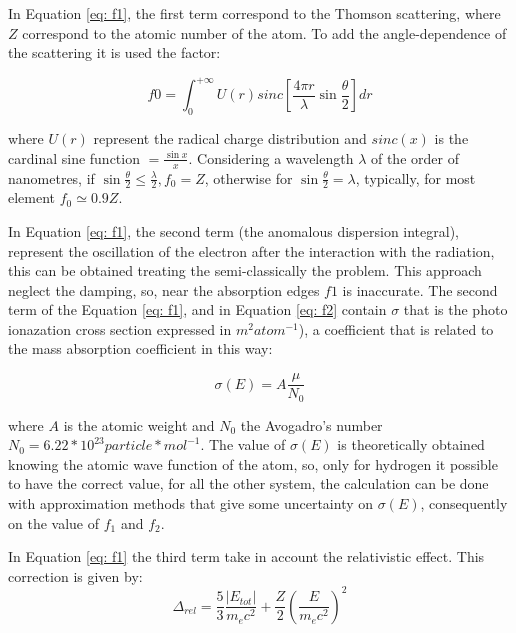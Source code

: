 \begin{flushleft}
In Equation \ref{eq: f1}, the first term correspond to the Thomson scattering, where $Z $ correspond to the atomic number of the atom. To add the angle-dependence of the scattering it is used the factor:
\end{flushleft}

\begin{equation}
f0 = \int_{0}^{+ \infty} U(r) sinc \left[ \frac{4 \pi r}{\lambda} \sin \frac{\theta}{2} \right] dr
\label{f0}
\end{equation}

\begin{flushleft}
where $U(r) $ represent the radical charge distribution and $sinc(x)$ is the cardinal sine function $ = \frac{\sin x}{x} $. Considering a wavelength $\lambda $ of the order of nanometres, if $\sin \frac{\theta}{2} \leq \frac{\lambda}{2}, f_0=Z $, otherwise for $\sin \frac{\theta}{2}=\lambda$, typically, for most element $ f_0 \simeq 0.9Z $.
\end{flushleft}
In Equation \ref{eq: f1}, the second term (the anomalous dispersion integral), represent the oscillation of the electron after the interaction with the radiation, this can be obtained treating the semi-classically the problem. This approach neglect the damping, so, near the absorption edges $f1 $ is inaccurate. The second term of the Equation \ref{eq: f1}, and in Equation \ref{eq: f2} contain $\sigma $ that is the photo ionazation cross section expressed in $m^2 atom ^{-1} $), a coefficient that is related to the mass absorption coefficient in this way: 

\begin{equation}
\sigma(E) = A \frac{\mu}{N_0}
\label{eq: sigma}
\end{equation}

\begin{flushleft}
where $A $ is the atomic weight and $N_0 $ the Avogadro's number $N_0 = 6.22 * 10^{23} particle*mol^{-1} $. The value of $\sigma(E) $ is theoretically obtained knowing the atomic wave function of the atom, so, only for hydrogen it possible to have the correct value, for all the other system, the calculation can be done with approximation methods that give some uncertainty on $\sigma(E) $, consequently on the value of $f_1 $ and $f_2 $.
\end{flushleft}
In Equation \ref{eq: f1} the third term take in account the relativistic effect. This correction is given by:
\begin{equation}
\Delta_{rel} = \frac{5}{3} \frac{|E_{tot}|}{m_e c^2} + \frac{Z}{2} \left( \frac{E}{m_e c^2} \right)^2
\label{eq: Delta_rel}
\end{equation}

